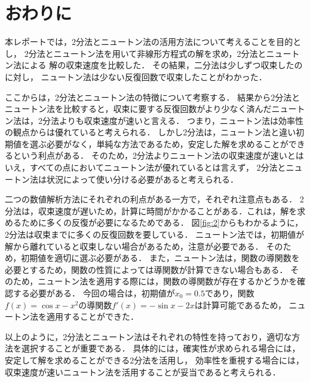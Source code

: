 \documentclass[uplatex]{jsarticle}
\begin{document}
\section{おわりに}
\indent
本レポートでは，2分法とニュートン法の活用方法について考えることを目的とし，
2分法とニュートン法を用いて非線形方程式の解を求め，2分法とニュートン法による
解の収束速度を比較した．
その結果，二分法は少しずつ収束したのに対し，
ニュートン法は少ない反復回数で収束したことがわかった．
\par
ここからは，2分法とニュートン法の特徴について考察する．
結果から2分法とニュートン法を比較すると，収束に要する反復回数がより少なく済んだニュートン法は，2分法よりも収束速度が速いと言える．
つまり，ニュートン法は効率性の観点からは優れていると考えられる．
しかし2分法は，ニュートン法と違い初期値を選ぶ必要がなく，単純な方法であるため，安定した解を求めることができるという利点がある．
そのため，2分法よりニュートン法の収束速度が速いとはいえ，すべての点においてニュートン法が優れているとは言えず，
2分法とニュートン法は状況によって使い分ける必要があると考えられる．
\par
二つの数値解析方法にそれぞれの利点がある一方で，それぞれ注意点もある．
2分法は，収束速度が遅いため，計算に時間がかかることがある．これは，解を求めるために多くの反復が必要になるためである．
図\ref{fig:2}からもわかるように，2分法は収束までに多くの反復回数を要している．
ニュートン法では，初期値が解から離れていると収束しない場合があるため，注意が必要である．
そのため，初期値を適切に選ぶ必要がある．
また，ニュートン法は，関数の導関数を必要とするため，関数の性質によっては導関数が計算できない場合もある．
そのため，ニュートン法を適用する際には，関数の導関数が存在するかどうかを確認する必要がある．
今回の場合は，初期値が$x_0=0.5$であり，関数$f(x)=\cos x - x^2$の導関数$f'(x)=-\sin x - 2x$は計算可能であるため，
ニュートン法を適用することができた．

\par
以上のように，2分法とニュートン法はそれぞれの特性を持っており，適切な方法を選択することが重要である．
具体的には，確実性が求められる場合には，安定して解を求めることができる2分法を活用し，
効率性を重視する場合には，収束速度が速いニュートン法を活用することが妥当であると考えられる．
\end{document}
